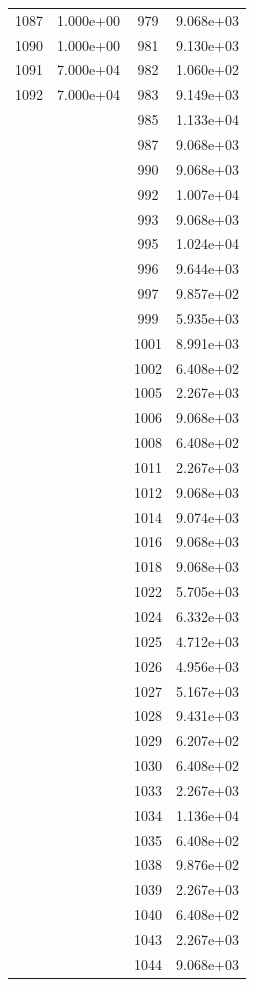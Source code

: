 \documentclass[12pt]{article}
\begin{document}
\begin{longtable}{@{}cccc@{}}
1087 & 1.000e+00 & 979 & 9.068e+03 \\
1090 & 1.000e+00 & 981 & 9.130e+03 \\
1091 & 7.000e+04 & 982 & 1.060e+02 \\
1092 & 7.000e+04 & 983 & 9.149e+03 \\
 &  & 985 & 1.133e+04 \\
 &  & 987 & 9.068e+03 \\
 &  & 990 & 9.068e+03 \\
 &  & 992 & 1.007e+04 \\
 &  & 993 & 9.068e+03 \\
 &  & 995 & 1.024e+04 \\
 &  & 996 & 9.644e+03 \\
 &  & 997 & 9.857e+02 \\
 &  & 999 & 5.935e+03 \\
 &  & 1001 & 8.991e+03 \\
 &  & 1002 & 6.408e+02 \\
 &  & 1005 & 2.267e+03 \\
 &  & 1006 & 9.068e+03 \\
 &  & 1008 & 6.408e+02 \\
 &  & 1011 & 2.267e+03 \\
 &  & 1012 & 9.068e+03 \\
 &  & 1014 & 9.074e+03 \\
 &  & 1016 & 9.068e+03 \\
 &  & 1018 & 9.068e+03 \\
 &  & 1022 & 5.705e+03 \\
 &  & 1024 & 6.332e+03 \\
 &  & 1025 & 4.712e+03 \\
 &  & 1026 & 4.956e+03 \\
 &  & 1027 & 5.167e+03 \\
 &  & 1028 & 9.431e+03 \\
 &  & 1029 & 6.207e+02 \\
 &  & 1030 & 6.408e+02 \\
 &  & 1033 & 2.267e+03 \\
 &  & 1034 & 1.136e+04 \\
 &  & 1035 & 6.408e+02 \\
 &  & 1038 & 9.876e+02 \\
 &  & 1039 & 2.267e+03 \\
 &  & 1040 & 6.408e+02 \\
 &  & 1043 & 2.267e+03 \\
 &  & 1044 & 9.068e+03 \\

\end{longtable}
\end{document}
